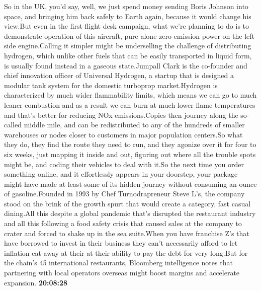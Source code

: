 \documentclass{article}%
\begin{document}
So in the UK, you'd say, well, we just spend money sending Boris Johnson into space, and bringing him back safely to Earth again, because it would change his view.But even in the first flight desk campaign, what we're planning to do is to demonstrate operation of this aircraft, pure{-}alone zero{-}emission power on the left side engine.Calling it simpler might be underselling the challenge of distributing hydrogen, which unlike other fuels that can be easily transported in liquid form, is usually found instead in a gaseous state.Jumpall Clark is the co{-}founder and chief innovation officer of Universal Hydrogen, a startup that is designed a modular tank system for the domestic turboprop market.Hydrogen is characterized by much wider flammability limits, which means we can go to much leaner combustion and as a result we can burn at much lower flame temperatures and that's better for reducing NOx emissions.Copies then journey along the so{-}called middle mile, and can be redistributed to any of the hundreds of smaller warehouses or nodes closer to customers in major population centers.So what they do, they find the route they need to run, and they agonize over it for four to six weeks, just mapping it inside and out, figuring out where all the trouble spots might be, and coding their vehicles to deal with it.So the next time you order something online, and it effortlessly appears in your doorstep, your package might have made at least some of its hidden journey without consuming an ounce of gasoline.Founded in 1993 by Chef Turnodrapreneur Steve L's, the company stood on the brink of the growth spurt that would create a category, fast casual dining.All this despite a global pandemic that's disrupted the restaurant industry and all this following a food safety crisis that caused sales at the company to crater and forced to shake up in the sea suite.When you have franchise Z's that have borrowed to invest in their business they can't necessarily afford to let inflation eat away at their at their ability to pay the debt for very long.But for the chain's 45 international restaurants, Bloomberg intelligence notes that partnering with local operators overseas might boost margins and accelerate expansion.%
\textbf{20:08:28}%
\end{document}
